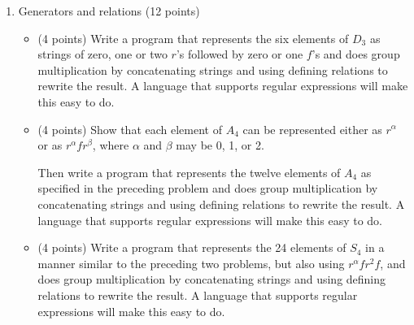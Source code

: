\documentclass[12pt]{article}
\begin{document}
\begin{enumerate}
\pagebreak
\item Generators and relations (12 points)
\begin{itemize}
\item (4 points) Write a program that represents the six elements of $D_3$ as strings of zero, one or two $r$'s followed by zero or one $f$'s and does group multiplication by concatenating strings and using defining relations to rewrite the result. A language that supports regular expressions will make this easy to do.

\item (4 points) Show that each element of $A_4$ can be represented either as $r^{\alpha}$ or as $r^{\alpha}fr^{\beta}$, where $\alpha$ and $\beta$ may be 0, 1, or 2.

Then write a program that represents the twelve elements of $A_4$ as specified in the preceding problem and does group multiplication by concatenating strings and using defining relations to rewrite the result. A language that supports regular expressions will make this easy to do.
 
\item (4 points)
Write a program that represents the 24 elements of $S_4$  in a manner similar to the preceding two problems, but also using $r^{\alpha}fr^{2}f$, and does group multiplication by concatenating strings and using defining relations to rewrite the result. A language that supports regular expressions will make this easy to do.

\end{itemize}
\end{enumerate}
\end{document}
